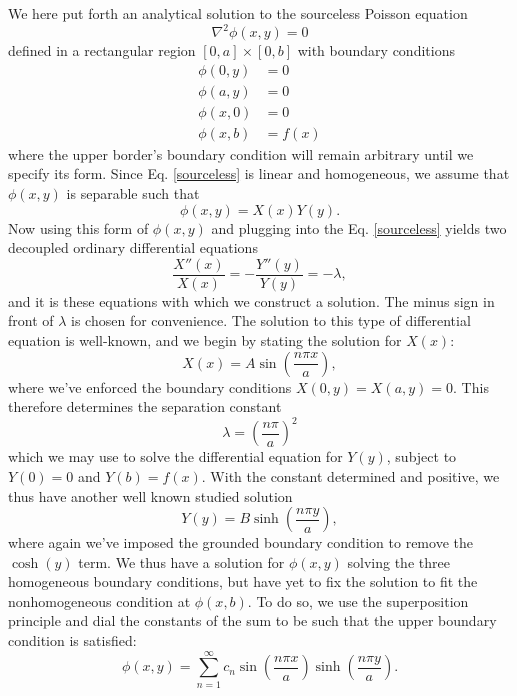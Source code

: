 \documentclass[reprint, amsmath, amssymb, aps, floatfix]{revtex4-1}
\begin{document}
We here put forth an analytical solution to the sourceless Poisson equation \begin{equation}
\nabla^2\phi(x,y)=0 \label{sourceless}
\end{equation} defined in a rectangular region $[0, a]\times [0, b]$ with boundary conditions
\begin{equation}
\begin{aligned}
\phi(0, y) &= 0 \\
\phi(a, y) &= 0\\
\phi(x, 0) &= 0\\
\phi(x, b) &= f(x) \label{bcs}
\end{aligned}
\end{equation} where the upper border's boundary condition will remain arbitrary until we specify its form. Since Eq. \ref{sourceless} is linear and homogeneous, we assume that $\phi(x,y)$ is separable such that \begin{equation} \phi(x,y)=X(x)Y(y). \label{separable} \end{equation} Now using this form of $\phi(x,y)$ and plugging into the Eq. \ref{sourceless} yields two decoupled ordinary differential equations \begin{equation}
\frac{X''(x)}{X(x)} = -\frac{Y''(y)}{Y(y)} = - \lambda, \label{separated}
\end{equation} and it is these equations with which we construct a solution. The minus sign in front of $\lambda$ is chosen for convenience. The solution to this type of differential equation is well-known, and we begin by stating the solution for $X(x)$: \begin{equation}
X(x) = A\sin\left(\frac{n\pi x}{a}\right), \label{xeq}
\end{equation} where we've enforced the boundary conditions $X(0, y)=X(a, y)=0$. This therefore determines the separation constant \begin{equation}
\lambda = \left(\frac{n\pi}{a}\right)^2 \label{lambda}
\end{equation} which we may use to solve the differential equation for $Y(y)$, subject to $Y(0)=0$ and $Y(b)=f(x)$. With the constant determined and positive, we thus have another well known studied solution \begin{equation}
Y(y) = B\sinh\left(\frac{n\pi y}{a}\right), \label{yeq}
\end{equation} where again we've imposed the grounded boundary condition to remove the $\cosh(y)$ term. We thus have a solution for $\phi(x,y)$ solving the three homogeneous boundary conditions, but have yet to fix the solution to fit the nonhomogeneous condition at $\phi(x,b)$. To do so, we use the superposition principle and dial the constants of the sum to be such that the upper boundary condition is satisfied: \begin{equation}
\phi(x,y)=\sum_{n=1}^\infty c_n \sin\left(\frac{n\pi x}{a}\right)\sinh\left(\frac{n\pi y}{a}\right) \label{phisum}.
\end{equation}
\end{document}
